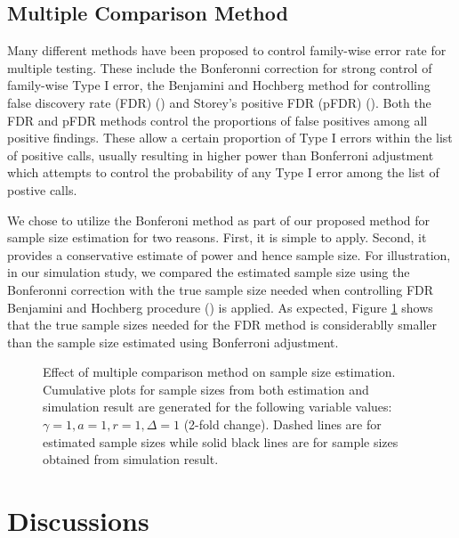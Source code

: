 \documentclass{bioinfo}
\begin{document}
\subsection{Multiple Comparison Method}

Many different methods have been proposed to control family-wise
error rate for multiple testing.  These include the Bonferonni
correction for strong control of family-wise Type I error, the
Benjamini and Hochberg method for controlling false discovery rate
(FDR) (\citealp{Benjamini95}) and Storey's positive FDR (pFDR)
(\citealp{Storey02}).  Both the FDR and pFDR methods control the
proportions of false positives among all positive findings.  These
allow a certain proportion of Type I errors within the list of
positive calls, usually resulting in higher power than Bonferroni
adjustment which attempts to control the probability of any Type I
error among the list of postive calls.  

We chose to utilize the Bonferoni method as part of our proposed
method for sample size estimation for two reasons. First, it is
simple to apply.  Second, it provides a conservative estimate of
power and hence sample size.  For illustration, in our simulation
study, we compared the estimated sample size using the Bonferonni
correction with the true sample size needed when controlling FDR
Benjamini and Hochberg procedure (\citealp{Benjamini95}) is applied.
As expected, Figure \ref{fig:ResMtd} shows that the true sample
sizes needed for the FDR method is considerablly smaller than the
sample size estimated using Bonferroni adjustment.

\begin{figure}[h]

  \caption[Effect of multiple comparison method on sample size estimation]
  {Effect of multiple comparison method on sample size estimation.
    Cumulative plots for sample sizes from both estimation and
    simulation result are generated for the following variable values: $\gamma = 1, a = 1, r = 1,
    \Delta = 1$ (2-fold change). Dashed lines are for estimated sample sizes
    while solid black lines are for sample sizes obtained from simulation result.}
  \label{fig:ResMtd}
\end{figure}

\section{Discussions}
\end{document}
